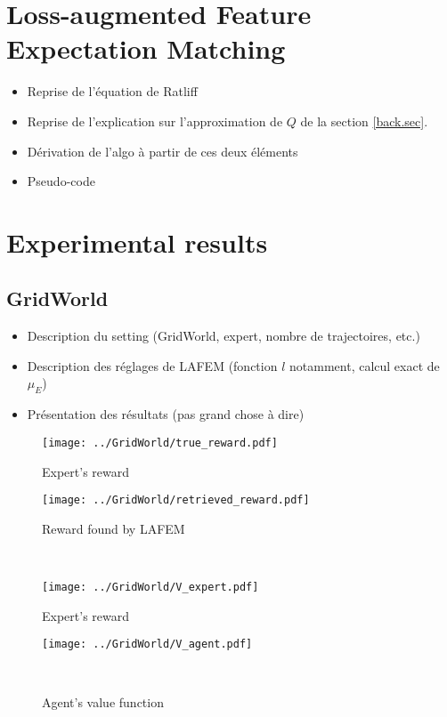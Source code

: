 \documentclass[publibook-draft]{CAp2012}
\begin{document}
\section{Loss-augmented Feature Expectation Matching}
\begin{itemize}
\item Reprise de l'équation de Ratliff
\item Reprise de l'explication sur l'approximation de $Q$ de la section \ref{back.sec}.
\item Dérivation de l'algo à partir de ces deux éléments
\item Pseudo-code
\end{itemize}
\section{Experimental results}
\subsection{GridWorld}
\begin{itemize}
\item Description du setting (GridWorld, expert, nombre de trajectoires, etc.)
\item Description des réglages de LAFEM (fonction $l$ notamment, calcul exact de $\mu_E$)
\item Présentation des résultats (pas grand chose à dire)
\end{itemize}
\begin{figure}
\begin{minipage}[t]{.4\linewidth}
    \begin{center}
       \texttt{[image: ../GridWorld/true\_reward.pdf]}
       \caption{Expert's reward}
       \label{nbabo}
    \end{center}
\end{minipage}
\hfill
\begin{minipage}[t]{.4\linewidth}
    \begin{center}
       \texttt{[image: ../GridWorld/retrieved\_reward.pdf]}
       \caption{Reward found by LAFEM}
       \label{croissnbabo}
    \end{center}
\end{minipage}\\
\begin{minipage}[t]{.4\linewidth}
    \begin{center}
       \texttt{[image: ../GridWorld/V\_expert.pdf]}
       \caption{Expert's reward}
       \label{nbabo}
    \end{center}
\end{minipage}
\hfill
\begin{minipage}[t]{.4\linewidth}
    \begin{center}
       \texttt{[image: ../GridWorld/V\_agent.pdf]}
       \caption{Agent's value function}
       \label{croissnbabo}
    \end{center}
\end{minipage}\\

\end{figure}
\end{document}
